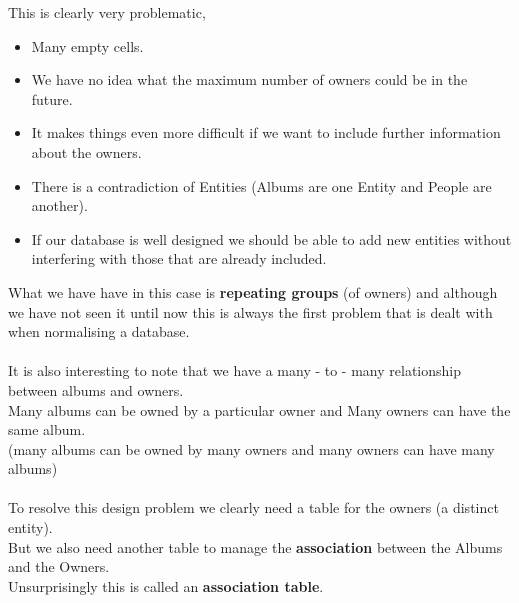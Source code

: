 \documentclass[a4paper,12pt]{article}
\begin{document}
This is clearly very problematic,
\begin{itemize}
	\item Many empty cells.
	\item We have no idea what the maximum number of owners could be in the future.
	\item It makes things even more difficult if we want to include further information about the owners.
	\item There is a contradiction of Entities (Albums are one Entity and People are another).
	\item If our database is well designed we should be able to add new entities without interfering with those that are already included.
\end{itemize}
What we have have in this case is \textbf{repeating groups} (of owners) and although we have not seen it until now this is always the first problem that is dealt with when normalising a database. \\\\
It is also interesting to note that we have a many - to - many relationship between albums and owners.\\
Many albums can be owned by a particular owner and Many owners can have the same album.\\
(many albums can be owned by many owners and many owners can have many albums)\\\\

To resolve this design problem we clearly need a table for the owners (a distinct entity).\\
But we also need another table to manage the \textbf{association} between the Albums and the Owners.\\
Unsurprisingly this is called an \textbf{association table}.\\
\end{document}

